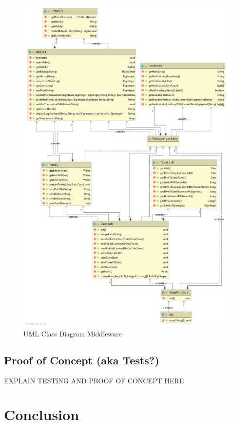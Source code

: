\begin{figure}[h]
	\includegraphics[width=0.7\paperwidth]{swaps-crop}
	\caption{UML Class Diagram Middleware}
	\label{fig:uml}
\end{figure}
\clearpage

\section{Proof of Concept (aka Tests?)}
\label{sec:chapter04:poc}
EXPLAIN TESTING AND PROOF OF CONCEPT HERE

\chapter{Conclusion}
\label{ch:chapter05}

